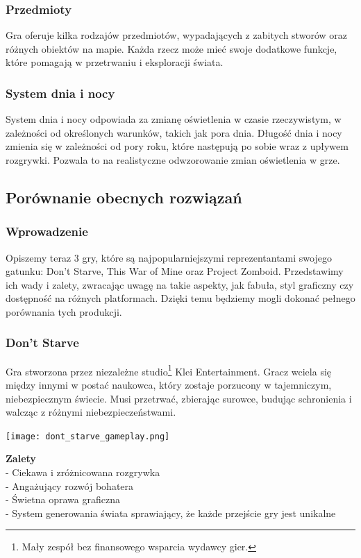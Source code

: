 \documentclass{article}
\begin{document}
\subsubsection{Przedmioty}
Gra oferuje kilka rodzajów przedmiotów, wypadających z zabitych stworów oraz różnych obiektów na mapie. Każda rzecz może mieć swoje dodatkowe funkcje, które pomagają w przetrwaniu i eksploracji świata.
\subsubsection{System dnia i nocy}
System dnia i nocy odpowiada za zmianę oświetlenia w czasie rzeczywistym, w zależności od określonych warunków, takich jak pora dnia. Długość dnia i nocy zmienia się w zależności od pory roku, które następują po sobie wraz z upływem rozgrywki. Pozwala to na realistyczne odwzorowanie zmian oświetlenia w grze.

\newpage
\subsection{Porównanie obecnych rozwiązań}
\subsubsection{Wprowadzenie}
Opiszemy teraz 3 gry, które są najpopularniejszymi reprezentantami swojego gatunku: Don't Starve, This War of Mine oraz Project Zomboid. Przedstawimy ich wady i zalety, zwracając uwagę na takie aspekty, jak fabuła, styl graficzny czy dostępność na różnych platformach. Dzięki temu będziemy mogli dokonać pełnego porównania tych produkcji.
\subsubsection{Don't Starve \cite{game:ds}}
 Gra stworzona przez niezależne studio\footnote{Mały zespół bez finansowego wsparcia wydawcy gier.\cite{wiki:indie-game}} Klei Entertainment. Gracz wciela się między innymi w postać naukowca, który zostaje porzucony w tajemniczym, niebezpiecznym świecie. Musi przetrwać, zbierając surowce, budując schronienia i walcząc z różnymi niebezpieczeństwami.
 
\begin{center}
     \texttt{[image: dont\_starve\_gameplay.png]}
\end{center}

\textbf{Zalety} \\
- Ciekawa i zróżnicowana rozgrywka\\
- Angażujący rozwój bohatera\\
- Świetna oprawa graficzna\\
- System generowania świata sprawiający, że każde przejście gry jest unikalne\\
\end{document}
